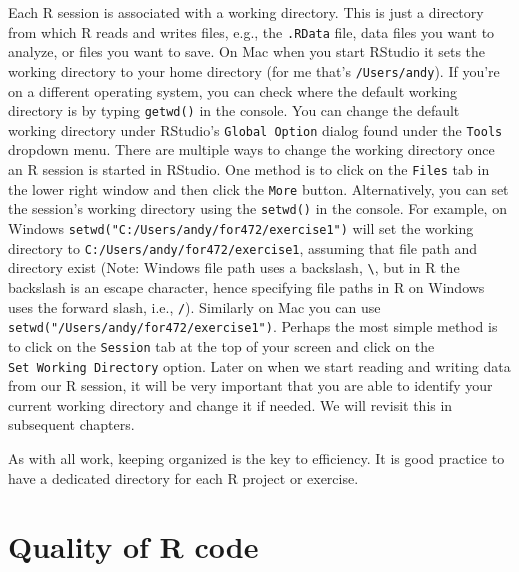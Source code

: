 \documentclass[]{krantz}
\begin{document}
Each R session is associated with a working directory. This is just a directory from which R reads and writes files, e.g., the \texttt{.RData} file, data files you want to analyze, or files you want to save. On Mac when you start RStudio it sets the working directory to your home directory (for me that's \texttt{/Users/andy}). If you're on a different operating system, you can check where the default working directory is by typing \texttt{getwd()} in the console. You can change the default working directory under RStudio's \texttt{Global\ Option} dialog found under the \texttt{Tools} dropdown menu. There are multiple ways to change the working directory once an R session is started in RStudio. One method is to click on the \texttt{Files} tab in the lower right window and then click the \texttt{More} button. Alternatively, you can set the session's working directory using the \texttt{setwd()} in the console. For example, on Windows \texttt{setwd("C:/Users/andy/for472/exercise1")} will set the working directory to \texttt{C:/Users/andy/for472/exercise1}, assuming that file path and directory exist (Note: Windows file path uses a backslash, \texttt{\textbackslash{}}, but in R the backslash is an escape character, hence specifying file paths in R on Windows uses the forward slash, i.e., \texttt{/}). Similarly on Mac you can use \texttt{setwd("/Users/andy/for472/exercise1")}. Perhaps the most simple method is to click on the \texttt{Session} tab at the top of your screen and click on the \texttt{Set\ Working\ Directory} option. Later on when we start reading and writing data from our R session, it will be very important that you are able to identify your current working directory and change it if needed. We will revisit this in subsequent chapters.

As with all work, keeping organized is the key to efficiency. It is good practice to have a dedicated directory for each R project or exercise.

\hypertarget{quality-of-r-code}{%
\section{Quality of R code}\label{quality-of-r-code}}
\end{document}
